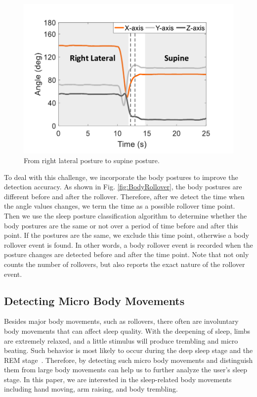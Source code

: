 \begin{figure}[!t]
\begin{minipage}[t]{0.31\linewidth}
    \includegraphics[width=0.97\linewidth]{Figures/RightToSupine.pdf}\centering
  \caption{From right lateral posture to supine posture.}\label{fig:RightToLeft}
\end{minipage}
\end{figure}

To deal with this challenge, we incorporate the body postures to improve the detection accuracy. As shown in Fig. \ref{fig:BodyRollover}, the body postures are different before and after the rollover. Therefore, after we detect the time when the angle values changes, we term the time as a possible rollover time point. Then we use the sleep posture classification algorithm to determine whether the body postures are the same or not over a period of time before and after this point. If the postures are the same, we exclude this time point, otherwise a body rollover event is found. In other words, a body rollover event is recorded when the posture changes are detected before and after the time point. Note that {\systemname} not only counts the number of rollovers, but also reports the exact nature of the rollover event.


\subsection{Detecting Micro Body Movements \label{sec:microbo}}

Besides major body movements, such as rollovers, there often are involuntary body movements that can affect sleep quality. With the
deepening of sleep, limbs are extremely relaxed, and a little stimulus will produce trembling and micro beating. Such behavior is most
likely to occur during the deep sleep stage and the REM stage~\cite{ancoli2003role,Jean2000Sleep}. Therefore, by detecting such micro body
movements and distinguish them from large body movements can help us to further analyze the user's sleep stage. In this paper, we are
interested in the sleep-related body movements including hand moving, arm raising, and body trembling.

